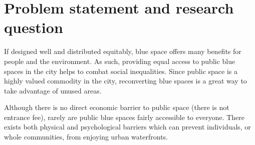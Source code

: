 \documentclass{article}
\begin{document}


\begin{comment}
- Importance of situating ??
- Right to the city enabled through public blue space (in connection to recognition justice)
	1. Public blue spaces are a shared, common good, that everyone should be able to access \parencite{wessells2014urban}	
	2. cite more general right to the city literature
	3. Sharing the benefits that waterfronts have on people and the environment
- individuals and communities are inextricably linked to place, and disrupting place/not providing it threatens their existence/belonging
\end{comment}

\pagebreak
\section{Problem statement and research question}

If designed well and distributed equitably, blue space offers many benefits for people and the environment. As such, providing equal access to public blue spaces in the city helps to combat social inequalities. Since public space is a highly valued commodity in the city, reconverting blue spaces is a great way to take advantage of unused areas. 

Although there is no direct economic barrier to public space (there is not entrance fee), rarely are public blue spaces fairly accessible to everyone. There exists both physical and psychological barriers which can prevent individuals, or whole communities, from enjoying urban waterfronts.
\end{document}
